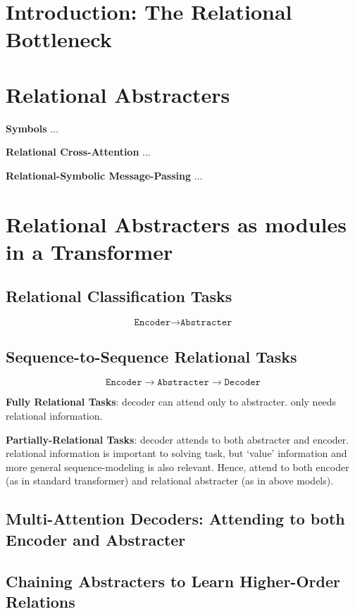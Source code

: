\section{Introduction: The Relational Bottleneck}

\section{Relational Abstracters}

\noindent\textbf{Symbols} ...

\noindent\textbf{Relational Cross-Attention} ...

\noindent\textbf{Relational-Symbolic Message-Passing} ...

\section{Relational Abstracters as modules in a Transformer}
\subsection{Relational Classification Tasks}
$$\texttt{Encoder} \to \texttt{Abstracter}$$

\subsection{Sequence-to-Sequence Relational Tasks}
$$\texttt{Encoder} \to \texttt{Abstracter} \to \texttt{Decoder}$$

\noindent\textbf{Fully Relational Tasks}: decoder can attend only to abstracter. only needs relational information.

\noindent\textbf{Partially-Relational Tasks}: decoder attends to both abstracter and encoder. relational information is important to solving task, but `value' information and more general sequence-modeling is also relevant. Hence, attend to both encoder (as in standard transformer) and relational abstracter (as in above models). 

\subsection{Multi-Attention Decoders: Attending to both Encoder and Abstracter}

\subsection{Chaining Abstracters to Learn Higher-Order Relations}

